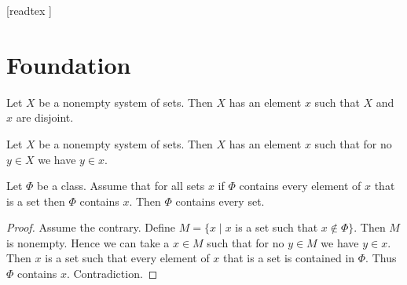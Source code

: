 \documentclass[10pt]{article}
\begin{document}
  \begin{imports}
    \begin{forthel}
      [readtex ]
    \end{forthel}
  \end{imports}


  \section{Foundation}

  \begin{forthel}
    \begin{axiom}[Foundation]
      Let $X$ be a nonempty system of sets.
      Then $X$ has an element $x$ such that $X$ and $x$ are disjoint.
    \end{axiom}
  \end{forthel}

  \begin{forthel}
    \begin{corollary}
      Let $X$ be a nonempty system of sets.
      Then $X$ has an element $x$ such that for no $y \in X$ we have $y \in x$.
    \end{corollary}
  \end{forthel}

  \begin{forthel}
    \begin{proposition}
      Let $\Phi$ be a class.
      Assume that for all sets $x$ if $\Phi$ contains every element of $x$ that is a set then $\Phi$ contains $x$.
      Then $\Phi$ contains every set.
    \end{proposition}
    \begin{proof}
      Assume the contrary.
      Define $M = \{ x \mid x$ is a set such that $x \notin \Phi \}$.
      Then $M$ is nonempty.
      Hence we can take a $x \in M$ such that for no $y \in M$ we have $y \in x$.
      Then $x$ is a set such that every element of $x$ that is a set is contained in $\Phi$.
      Thus $\Phi$ contains $x$.
      Contradiction.
    \end{proof}
  \end{forthel}
\end{document}
